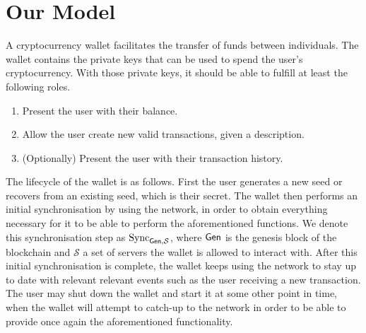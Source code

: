 \section{Our Model}
A cryptocurrency wallet facilitates the transfer of funds between individuals. The wallet contains the private keys that can be used to spend the user's cryptocurrency. With those private keys, it should be able to fulfill at least the following roles.

\begin{enumerate}
    \item Present the user with their balance.
    \item Allow the user create new valid transactions, given a description.
    \item (Optionally) Present the user with their transaction history.
\end{enumerate}

The lifecycle of the wallet is as follows. First the user generates a new seed or recovers from an existing seed, which is their secret. The wallet then performs an initial synchronisation by using the network, in order to obtain everything necessary for it to be able to perform the aforementioned functions. We denote this synchronisation step as $\text{Sync}_{\textsf{Gen}, \mathcal{S}}$, where $\textsf{Gen}$ is the genesis block of the blockchain and $\mathcal{S}$ a set of servers the wallet is allowed to interact with. After this initial synchronisation is complete, the wallet keeps using the network to stay up to date with relevant relevant events such as the user receiving a new transaction. The user may shut down the wallet and start it at some other point in time, when the wallet will attempt to catch-up to the network in order to be able to provide once again the aforementioned functionality.
